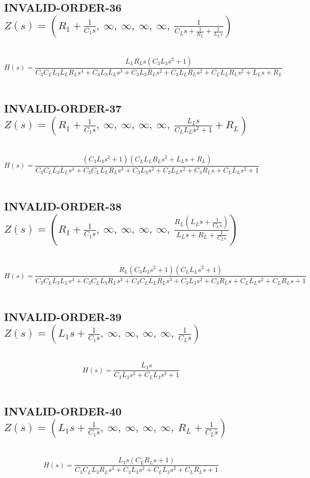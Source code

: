 \documentclass{article}
\begin{document}
\subsection{INVALID-ORDER-36 $Z(s) = \left( R_{1} + \frac{1}{C_{1} s}, \  \infty, \  \infty, \  \infty, \  \infty, \  \frac{1}{C_{L} s + \frac{1}{R_{L}} + \frac{1}{L_{L} s}}\right)$ } \ 
\textbf{\[H(s) = \frac{L_{L} R_{L} s \left(C_{3} L_{3} s^{2} + 1\right)}{C_{3} C_{L} L_{3} L_{L} R_{L} s^{4} + C_{3} L_{3} L_{L} s^{3} + C_{3} L_{3} R_{L} s^{2} + C_{3} L_{L} R_{L} s^{2} + C_{L} L_{L} R_{L} s^{2} + L_{L} s + R_{L}}\] } \ 
\subsection{INVALID-ORDER-37 $Z(s) = \left( R_{1} + \frac{1}{C_{1} s}, \  \infty, \  \infty, \  \infty, \  \infty, \  \frac{L_{L} s}{C_{L} L_{L} s^{2} + 1} + R_{L}\right)$ } \ 
\textbf{\[H(s) = \frac{\left(C_{3} L_{3} s^{2} + 1\right) \left(C_{L} L_{L} R_{L} s^{2} + L_{L} s + R_{L}\right)}{C_{3} C_{L} L_{3} L_{L} s^{4} + C_{3} C_{L} L_{L} R_{L} s^{3} + C_{3} L_{3} s^{2} + C_{3} L_{L} s^{2} + C_{3} R_{L} s + C_{L} L_{L} s^{2} + 1}\] } \ 
\subsection{INVALID-ORDER-38 $Z(s) = \left( R_{1} + \frac{1}{C_{1} s}, \  \infty, \  \infty, \  \infty, \  \infty, \  \frac{R_{L} \left(L_{L} s + \frac{1}{C_{L} s}\right)}{L_{L} s + R_{L} + \frac{1}{C_{L} s}}\right)$ } \ 
\textbf{\[H(s) = \frac{R_{L} \left(C_{3} L_{3} s^{2} + 1\right) \left(C_{L} L_{L} s^{2} + 1\right)}{C_{3} C_{L} L_{3} L_{L} s^{4} + C_{3} C_{L} L_{3} R_{L} s^{3} + C_{3} C_{L} L_{L} R_{L} s^{3} + C_{3} L_{3} s^{2} + C_{3} R_{L} s + C_{L} L_{L} s^{2} + C_{L} R_{L} s + 1}\] } \ 
\subsection{INVALID-ORDER-39 $Z(s) = \left( L_{1} s + \frac{1}{C_{1} s}, \  \infty, \  \infty, \  \infty, \  \infty, \  \frac{1}{C_{L} s}\right)$ } \ 
\textbf{\[H(s) = \frac{L_{3} s}{C_{3} L_{3} s^{2} + C_{L} L_{3} s^{2} + 1}\] } \ 
\subsection{INVALID-ORDER-40 $Z(s) = \left( L_{1} s + \frac{1}{C_{1} s}, \  \infty, \  \infty, \  \infty, \  \infty, \  R_{L} + \frac{1}{C_{L} s}\right)$ } \ 
\textbf{\[H(s) = \frac{L_{3} s \left(C_{L} R_{L} s + 1\right)}{C_{3} C_{L} L_{3} R_{L} s^{3} + C_{3} L_{3} s^{2} + C_{L} L_{3} s^{2} + C_{L} R_{L} s + 1}\] } \ 
\end{document}
